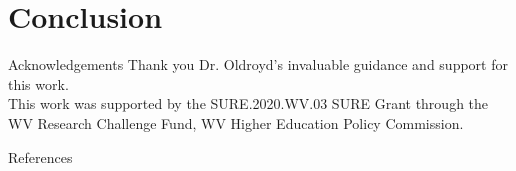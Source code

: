 \documentclass{beamer}
\begin{document}
\section{Conclusion}
\begin{frame}{Acknowledgements}
    Thank you Dr. Oldroyd's invaluable guidance and support for this work. \\
    
    This work was supported by the SURE.2020.WV.03 SURE Grant through the WV Research Challenge Fund, WV Higher Education Policy Commission.
\end{frame}


{
\usebackgroundtemplate{}
\begin{frame}[allowframebreaks]{References}
    \printbibliography
    
\end{frame}
}
 
\end{document}
